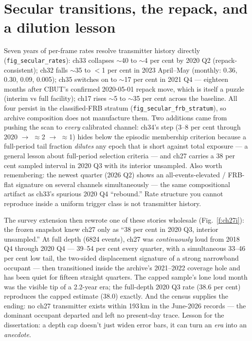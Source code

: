 \documentclass[10pt]{article}
\begin{document}
\section{Secular transitions, the repack, and a dilution lesson}
Seven years of per-frame rates resolve transmitter history directly
(\texttt{fig\_secular\_rates}): ch33 collapses $\sim$40 to $\sim$4 per
cent by 2020 Q2 (repack-consistent); ch32 falls $\sim$35 to $<$1 per
cent in 2023 April--May (monthly: 0.36, 0.30, 0.09, 0.005); ch35
switches on to $\sim$17 per cent in 2021 Q4 --- eighteen months after
CBUT's confirmed 2020-05-01 repack move, which is itself a puzzle
(interim vs full facility); ch17 rises $\sim$5 to $\sim$35 per cent
across the baseline. All four persist in the classified-FRB stratum
(\texttt{fig\_secular\_frb\_stratum}), so archive composition does not
manufacture them. Two additions came from pushing the scan to
\emph{every} calibrated channel: ch34's step (3--8 per cent through
2020 $\rightarrow$ $\approx$2 $\rightarrow$ $\approx$1) hides below
the episodic membership criterion because a full-period tail fraction
\emph{dilutes} any epoch that is short against total exposure --- a
general lesson about full-period selection criteria --- and ch27
carries a 38 per cent sampled interval in 2020 Q3 with its interior
unsampled. Also worth remembering: the newest quarter (2026 Q2) shows
an all-events-elevated / FRB-flat signature on several channels
simultaneously --- the same compositional artifact as ch33's spurious
2020 Q4 ``rebound.'' Rate structure you cannot reproduce inside a
uniform trigger class is not transmitter history.

The survey extension then rewrote one of these stories wholesale
(Fig.~\ref{f:ch27i}): the frozen snapshot knew ch27 only as ``38 per
cent in 2020 Q3, interior unsampled.'' At full depth (6824 events),
ch27 was \emph{continuously} loud from 2018 Q4 through 2020 Q4 ---
39--54 per cent every quarter, with a simultaneous 33--46 per cent low
tail, the two-sided displacement signature of a strong narrowband
occupant --- then transitioned inside the archive's 2021--2022
coverage hole and has been quiet for fifteen straight quarters. The
capped sample's lone loud month was the visible tip of a 2.2-year
era; the full-depth 2020 Q3 rate (38.6 per cent) reproduces the
capped estimate (38.0) exactly. And the census supplies the ending:
no ch27 transmitter exists within 193\,km in the June-2026 records
--- the dominant occupant departed and left no present-day trace.
Lesson for the dissertation: a depth cap doesn't just widen error
bars, it can turn an \emph{era} into an \emph{anecdote}.
\end{document}

